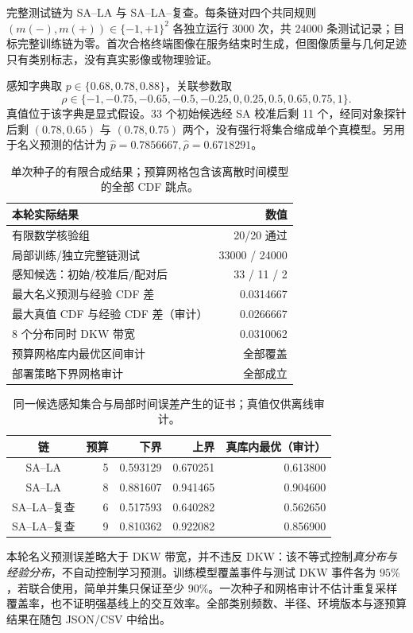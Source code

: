 \documentclass[11pt,a4paper,fontset=fandol]{ctexart}
\theoremstyle{definition}\newtheorem{definition}[theorem]{定义}
\theoremstyle{remark}\newtheorem{remark}[theorem]{说明}
\numberwithin{equation}{section}
\begin{document}
完整测试链为 SA--LA 与 SA--LA--复查。每条链对四个共同规则 $(m(-),m(+))\in\{-1,+1\}^2$ 各独立运行 3000 次，共 24000 条测试记录；目标完整训练链为零。首次合格终端图像在服务结束时生成，但图像质量与几何足迹只有类别标志，没有真实影像或物理验证。

感知字典取 $p\in\{0.68,0.78,0.88\}$，关联参数取
\[
\rho\in\{-1,-0.75,-0.65,-0.5,-0.25,0,0.25,0.5,0.65,0.75,1\}.
\]
真值位于该字典是显式假设。33 个初始候选经 SA 校准后剩 11 个，经同对象探针后剩
$(0.78,0.65)$ 与 $(0.78,0.75)$ 两个，没有强行将集合缩成单个真模型。另用于名义预测的估计为 $\widehat p=0.7856667,\widehat\rho=0.6718291$。

\begin{table}[htbp]\centering\small
\begin{tabularx}{\linewidth}{Y r}\toprule
本轮实际结果 & 数值\\\midrule
有限数学核验组 & 20/20 通过\\
局部训练/独立完整链测试 & 33000 / 24000\\
感知候选：初始/校准后/配对后 & 33 / 11 / 2\\
最大名义预测与经验 CDF 差 & 0.0314667\\
最大真值 CDF 与经验 CDF 差（审计） & 0.0266667\\
8 个分布同时 DKW 带宽 & 0.0310062\\
预算网格库内最优区间审计 & 全部覆盖\\
部署策略下界网格审计 & 全部成立\\\bottomrule
\end{tabularx}
\caption{单次种子的有限合成结果；预算网格包含该离散时间模型的全部 CDF 跳点。}
\end{table}

\begin{table}[htbp]\centering\small
\begin{tabular}{c r r r r}\toprule
链 & 预算 & 下界 & 上界 & 真库内最优（审计）\\\midrule
SA--LA & 5 & 0.593129 & 0.670251 & 0.613800\\
SA--LA & 8 & 0.881607 & 0.941465 & 0.904600\\
SA--LA--复查 & 6 & 0.517593 & 0.640282 & 0.562650\\
SA--LA--复查 & 9 & 0.810362 & 0.922082 & 0.856900\\\bottomrule
\end{tabular}
\caption{同一候选感知集合与局部时间误差产生的证书；真值仅供离线审计。}
\end{table}

本轮名义预测误差略大于 DKW 带宽，并不违反 DKW：该不等式控制\emph{真分布与经验分布}，不自动控制学习预测。训练模型覆盖事件与测试 DKW 事件各为 $95\%$，若联合使用，简单并集只保证至少 $90\%$。一次种子和网格审计不估计重复采样覆盖率，也不证明强基线上的交互效率。全部类别频数、半径、环境版本与逐预算结果在随包 JSON/CSV 中给出。
\end{document}
